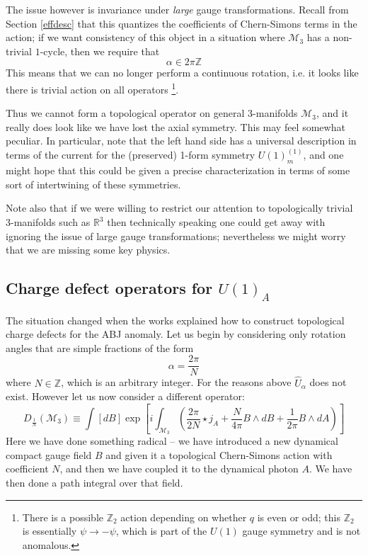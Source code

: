 \documentclass[aps,preprint,nofootinbib,preprintnumbers,eqsecnum,superscriptaddress]{revtex4}
\newcommand{\be}{\begin{equation}}
\newcommand{\ee}{\end{equation}}
\def\le{\left}
\def\ri{\right}
\def\al{{\alpha}}
\newcommand\sM{{\ensuremath{{\mathcal M}}}}
\numberwithin{equation}{section}
\begin{document}
The issue however is invariance under {\it large} gauge transformations. Recall from Section \ref{effdesc} that this quantizes the coefficients of Chern-Simons terms in the action; if we want consistency of this object in a situation where $\sM_3$ has a non-trivial $1$-cycle, then we require that 
\be
\al \in 2\pi\mathbb{Z}
\ee
This means that we can no longer perform a continuous rotation, i.e. it looks like there is trivial action on all operators \footnote{There is a possible $\mathbb{Z}_2$ action depending on whether $q$ is even or odd; this $\mathbb{Z}_2$ is essentially $\psi \to -\psi$, which is part of the $U(1)$ gauge symmetry and is not anomalous.}. 

Thus we cannot form a topological operator on general 3-manifolds $\sM_3$, and it really does look like we have lost the axial symmetry. This may feel somewhat peculiar. In particular, note that the left hand side has a universal description in terms of the current for the (preserved) 1-form symmetry $U(1)^{(1)}_m$, and one might hope that this could be given a precise characterization in terms of some sort of intertwining of these symmetries. 

Note also that if we were willing to restrict our attention to topologically trivial 3-manifolds such as $\mathbb{R}^3$ then technically speaking one could get away with ignoring the issue of large gauge transformations; nevertheless we might worry that we are missing some key physics. 
\subsection{Charge defect operators for $U(1)_A$}
The situation changed when the works \cite{Choi:2022jqy,Cordova:2022ieu} explained how to construct topological charge defects for the ABJ anomaly. Let us begin by considering only rotation angles that are simple fractions of the form 
\be
\al = \frac{2\pi}{N}
\ee
where $N \in \mathbb{Z}$, which is an arbitrary integer. For the reasons above $\hat{U}_{\al}$ does not exist. However let us now consider a different operator:
\be
D_{\frac{1}{N}}(\sM_3) \equiv \int [dB] \exp\le[i\int_{\sM_3} \le(\frac{2\pi}{2N} \star j_A + \frac{N}{4\pi} B \wedge dB + \frac{1}{2\pi} B \wedge dA\ri)\ri] \label{noninvdef} 
\ee
Here we have done something radical -- we have introduced a new dynamical compact gauge field $B$ and given it a topological Chern-Simons action with coefficient $N$, and then we have coupled it to the dynamical photon $A$. We have then done a path integral over that field. 
\end{document}

